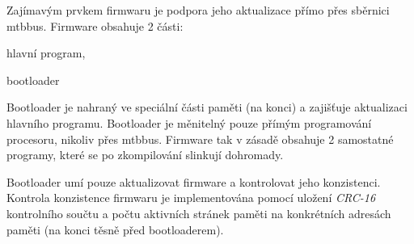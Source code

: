 Zajímavým prvkem firmwaru je podpora jeho aktualizace přímo přes sběrnici
\gls{mtbbus}. Firmware obsahuje 2 části:

\begin{compactenum}
\item hlavní program,
\item bootloader
\end{compactenum}

Bootloader je nahraný ve speciální části paměti (na konci) a zajišťuje
aktualizaci hlavního programu. Bootloader je měnitelný pouze přímým
programování procesoru, nikoliv přes \gls{mtbbus}. Firmware tak v zásadě
obsahuje 2 samostatné programy, které se po zkompilování slinkují dohromady.

Bootloader umí pouze aktualizovat firmware a kontrolovat jeho konzistenci.
Kontrola konzistence firmwaru je implementována pomocí uložení \textit{CRC-16}
kontrolního součtu a počtu aktivních stránek paměti na konkrétních adresách
paměti (na konci těsně před bootloaderem).
